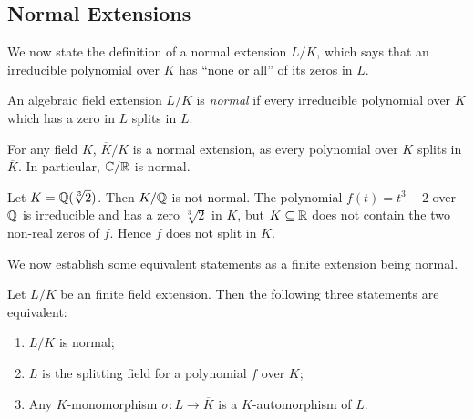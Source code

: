 %



\subsection{Normal Extensions}

We now state the definition of a normal extension $L/K$, which says that an irreducible polynomial over $K$ has ``none or all'' of its zeros in $L$. 

\begin{definition}
    An algebraic field extension $L/ K$ is \textit{normal} if every irreducible polynomial over $K$ which has a zero in $L$ splits in $L$. 
\end{definition}

\begin{example}
	For any field $K$, $\overline K / K$ is a normal extension, as every polynomial over $K$ splits in $\overline K$. In particular, $\mathbb C / \mathbb R$ is normal. 
\end{example}


\begin{example}
    Let $K = \mathbb Q(\sqrt[3]{2})$. Then $K / \mathbb Q$ is not normal. The polynomial $f(t) = t^3 - 2$ over $\mathbb Q$ is irreducible and has a zero $\sqrt[3]{2}$ in $K$, but $K \subseteq \mathbb R$ does not contain the two non-real zeros of $f$. Hence $f$ does not split in $K$.
\end{example}

We now establish some equivalent statements as a finite extension being normal.

\begin{theorem} \label{thm:normal-equiv-def}
    Let $L/K$ be an finite field extension. Then the following three statements are equivalent:
    \begin{enumerate}[label=(\roman*)]
        \item $L/K$ is normal;
        \item $L$ is the splitting field for a polynomial $f$ over $K$;
        \item Any $K$-monomorphism $\sigma: L \to \overline K$ is a $K$-automorphism of $L$. 
    \end{enumerate}
\end{theorem}


